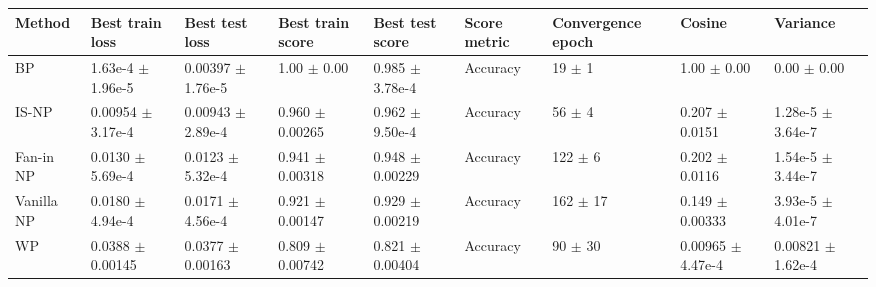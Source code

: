 \begin{tabular}{lllllllll}
\toprule
Method & Best train loss & Best test loss & Best train score & Best test score & Score metric & Convergence epoch & Cosine & Variance \\
\midrule
BP & 1.63e-4 $\pm$ 1.96e-5 & 0.00397 $\pm$ 1.76e-5 & 1.00 $\pm$ 0.00 & 0.985 $\pm$ 3.78e-4 & Accuracy & 19 $\pm$ 1 & 1.00 $\pm$ 0.00 & 0.00 $\pm$ 0.00 \\
IS-NP & 0.00954 $\pm$ 3.17e-4 & 0.00943 $\pm$ 2.89e-4 & 0.960 $\pm$ 0.00265 & 0.962 $\pm$ 9.50e-4 & Accuracy & 56 $\pm$ 4 & 0.207 $\pm$ 0.0151 & 1.28e-5 $\pm$ 3.64e-7 \\
Fan-in NP & 0.0130 $\pm$ 5.69e-4 & 0.0123 $\pm$ 5.32e-4 & 0.941 $\pm$ 0.00318 & 0.948 $\pm$ 0.00229 & Accuracy & 122 $\pm$ 6 & 0.202 $\pm$ 0.0116 & 1.54e-5 $\pm$ 3.44e-7 \\
Vanilla NP & 0.0180 $\pm$ 4.94e-4 & 0.0171 $\pm$ 4.56e-4 & 0.921 $\pm$ 0.00147 & 0.929 $\pm$ 0.00219 & Accuracy & 162 $\pm$ 17 & 0.149 $\pm$ 0.00333 & 3.93e-5 $\pm$ 4.01e-7 \\
WP & 0.0388 $\pm$ 0.00145 & 0.0377 $\pm$ 0.00163 & 0.809 $\pm$ 0.00742 & 0.821 $\pm$ 0.00404 & Accuracy & 90 $\pm$ 30 & 0.00965 $\pm$ 4.47e-4 & 0.00821 $\pm$ 1.62e-4 \\
\bottomrule
\end{tabular}
